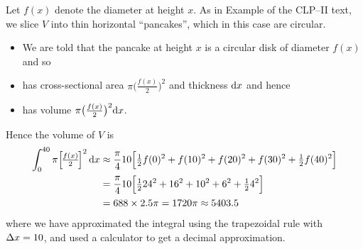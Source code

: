 \begin{solution}
Let $f(x)$ denote the diameter at height $x$.
As in Example  of the
CLP--II text, we slice $V$  into thin horizontal ``pancakes'', which in
this case are circular.

\begin{center}
\end{center}

\begin{itemize}
\item We are told that the pancake at height $x$ is a circular disk
of diameter $f(x)$ and so
\item has cross-sectional area $\pi\big(\frac{f(x)}{2}\big)^2$ and
thickness $\mathrm{d}x$ and hence
\item has volume $\pi\big(\frac{f(x)}{2}\big)^2\mathrm{d}x$.
\end{itemize}


\noindent Hence the volume of $V$ is
\begin{align*}
\int_0^{40}\pi\Big{[\frac{f(x)}{2}\Big]}^2\,\mathrm{d}x
&\approx \frac{\pi}{4}10\Big[\tfrac{1}{2} f(0)^2+f(10)^2+f(20)^2+f(30)^2+\tfrac{1}{2}
f(40)^2\Big]\\
&=\frac{\pi}{4}10\Big[\tfrac{1}{2} 24^2+16^2+10^2+6^2+\tfrac{1}{2} 4^2\Big]\\
&=688\times 2.5\pi
=1720\pi\approx 5403.5
\end{align*}
where we have approximated the integral using the trapezoidal rule with $\Delta
x=10$, and used a calculator to get a decimal approximation.


\end{solution}
